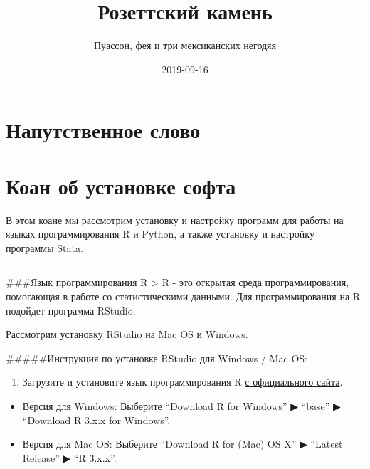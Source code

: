 \documentclass[]{book}
\title{Розеттский камень}
\author{Пуассон, фея и три мексиканских негодяя}
\date{2019-09-16}
\providecommand{\tightlist}{%
  \setlength{\itemsep}{0pt}\setlength{\parskip}{0pt}}
\begin{document}
\maketitle

{
\setcounter{tocdepth}{1}
\tableofcontents
}
\hypertarget{-}{%
\chapter{Напутственное слово}\label{-}}

\hypertarget{installsoft}{%
\chapter{Коан об установке софта}\label{installsoft}}

В этом коане мы рассмотрим установку и настройку программ для работы на языках программирования R и Python, а также установку и настройку программы Stata.

\begin{center}\rule{0.5\linewidth}{\linethickness}\end{center}

\#\#\#Язык программирования R
\textgreater{} R - это открытая среда программирования, помогающая в работе со статистическими данными. Для программирования на R подойдет программа RStudio.

Рассмотрим установку RStudio на Mac OS и Windows.

\#\#\#\#\#Инструкция по установке RStudio для Windows / Mac OS:

\begin{enumerate}
\def\labelenumi{\arabic{enumi}.}
\tightlist
\item
  Загрузите и установите язык программирования R \href{http://cran.cnr.berkeley.edu/}{с официального сайта}.
\end{enumerate}

\begin{itemize}
\item
  Версия для Windows: Выберите ``Download R for Windows'' ▶ ``base'' ▶ ``Download R 3.x.x for Windows''.
\item
  Версия для Mac OS: Выберите ``Download R for (Mac) OS X'' ▶ ``Latest Release'' ▶ ``R 3.x.x''.
\end{itemize}
\end{document}
